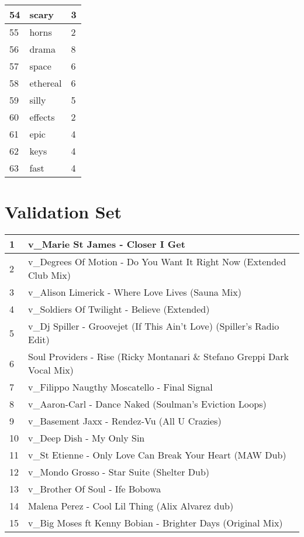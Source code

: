 \begin{appendices}
\begin{tabular}{| p{} | p{} | p{}|}
\hline
54 & scary & 3\\
\hline 
55 & horns & 2\\
\hline
56 & drama & 8\\
\hline
57 & space & 6\\
\hline
58 & ethereal & 6\\
\hline
59 & silly & 5\\
\hline
60 & effects & 2\\
\hline
61 & epic & 4\\
\hline
62 & keys & 4\\
\hline
63 & fast & 4\\
\hline
\end{tabular}
\clearpage

\section{Validation Set}
\label{validationset}
\begin{longtable}{| p{} | p{} |}
\hline 
1 & v{\_}Marie St James - Closer I Get \\
\hline
2 & v{\_}Degrees Of Motion - Do You Want It Right Now (Extended Club Mix) \\
\hline
3 & v{\_}Alison Limerick - Where Love Lives (Sauna Mix) \\
\hline
4 & v{\_}Soldiers Of Twilight - Believe (Extended) \\
\hline
5 & v{\_}Dj Spiller - Groovejet (If This Ain't Love) (Spiller's Radio Edit) \\
\hline
6 & Soul Providers - Rise (Ricky Montanari {\&} Stefano Greppi Dark Vocal Mix) \\
\hline
7 & v{\_}Filippo Naugthy Moscatello - Final Signal \\
\hline
8 & v{\_}Aaron-Carl - Dance Naked (Soulman's Eviction Loops) \\
\hline
9 & v{\_}Basement Jaxx - Rendez-Vu (All U Crazies) \\
\hline
10 & v{\_}Deep Dish - My Only Sin \\
\hline
11 & v{\_}St Etienne - Only Love Can Break Your Heart (MAW Dub) \\
\hline
12 & v{\_}Mondo Grosso - Star Suite (Shelter Dub) \\
\hline
13 & v{\_}Brother Of Soul - Ife Bobowa \\
\hline
14 & Malena Perez - Cool Lil Thing (Alix Alvarez dub)\\
\hline
15 & v{\_}Big Moses ft Kenny Bobian - Brighter Days (Original Mix)\\

\end{longtable}
\end{appendices}
